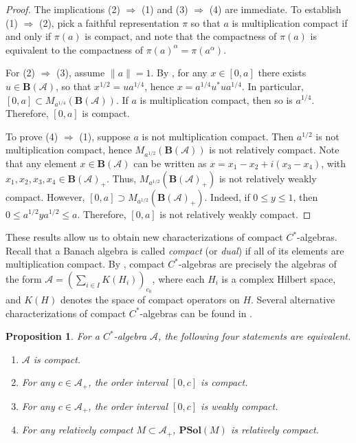 \documentclass[12pt]{amsart}
\theoremstyle{plain}
\newtheorem{proposition}[theorem]{Proposition}
\theoremstyle{definition}
\renewcommand{\leq}{\leqslant}
\newcommand{\ball}{\mathbf{B}}
\newcommand{\A}{\mathcal{A}}
\newcommand{\psol}{\mathbf{PSol}}
\def \tr{{\mathrm{Tr}} }
\begin{document}
\begin{proof}
The implications (2) $\Rightarrow$ (1) and (3) $\Rightarrow$ (4)
are immediate. To establish (1) $\Rightarrow$ (2), pick a
faithful representation $\pi$ so that $a$ is multiplication compact
if and only if $\pi(a)$ is compact, and note that the compactness 
of $\pi(a)$ is equivalent to the compactness of
$\pi(a)^\alpha = \pi(a^\alpha)$. 

For (2) $\Rightarrow$ (3), assume $\|a\| = 1$.
By \cite[Lemma I.5.2]{Da},
for any $x \in [0,a]$ there exists $u \in \ball(\A)$,
so that $x^{1/2} = u a^{1/4}$, hence $x = a^{1/4} u^* u a^{1/4}$.
In particular, $[0,a] \subset M_{a^{1/4}}(\ball(\A))$.
If $a$ is multiplication compact, then so is $a^{1/4}$.
Therefore, $[0,a]$ is compact.

To prove (4) $\Rightarrow$ (1), suppose $a$ is not
multiplication compact. Then $a^{1/2}$ is not multiplication
compact, hence $M_{a^{1/2}}(\ball(\A))$ is not relatively compact.
Note that any element $x \in \ball(\A)$ can be written as
$x = x_1 - x_2 + i (x_3 - x_4)$, with $x_1, x_2, x_3, x_4 \in \ball(\A)_+$.
Thus, $M_{a^{1/2}}(\ball(\A)_+)$ is not relatively weakly compact. However,
$[0,a] \supset M_{a^{1/2}}(\ball(\A)_+)$. Indeed, if $0 \leq y \leq 1$,
then $0 \leq a^{1/2} y a^{1/2} \leq a$. Therefore, $[0,a]$
is not relatively weakly compact.
\end{proof}

These results allow us to obtain new characterizations of compact
$C^*$-algebras. Recall that a Banach algebra is called \emph{compact} (or
\emph{dual}) if all of its elements are multiplication compact.
By \cite{Al}, compact $C^*$-algebras are precisely the
algebras of the form $\A = (\sum_{i \in I} K(H_i))_{c_0}$, where
each $H_i$ is a complex Hilbert space, and $K(H)$ denotes the
space of compact operators on $H$.
Several alternative characterizations of
compact $C^*$-algebras can be found in \cite[4.7.20]{Dix}.

\begin{proposition}\label{prop:dual_alg}
For a $C^*$-algebra $\A$, the following four statements are equivalent.
\begin{enumerate}
\item
$\A$ is compact.
\item
For any $c \in \A_+$, the order interval $[0,c]$ is compact.
\item
For any $c \in \A_+$, the order interval $[0,c]$ is weakly compact.
\item
For any relatively compact $M \subset \A_+$, $\psol(M)$ is relatively compact.
\end{enumerate}
\end{proposition}
\end{document}
